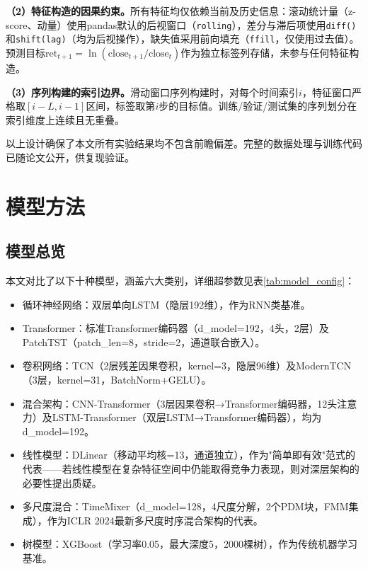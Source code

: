 \documentclass[12pt,a4paper]{ctexart}
\begin{document}
\textbf{（2）特征构造的因果约束。}所有特征均仅依赖当前及历史信息：滚动统计量（z-score、动量）使用pandas默认的后视窗口（\texttt{rolling}），差分与滞后项使用\texttt{diff()}和\texttt{shift(lag)}（均为后视操作），缺失值采用前向填充（\texttt{ffill}，仅使用过去值）。预测目标$\text{ret}_{t+1} = \ln(\text{close}_{t+1} / \text{close}_t)$作为独立标签列存储，未参与任何特征构造。

\textbf{（3）序列构建的索引边界。}滑动窗口序列构建时，对每个时间索引$i$，特征窗口严格取$[i-L, i-1]$区间，标签取第$i$步的目标值。训练/验证/测试集的序列划分在索引维度上连续且无重叠。

以上设计确保了本文所有实验结果均不包含前瞻偏差。完整的数据处理与训练代码已随论文公开，供复现验证。

\section{模型方法}

\subsection{模型总览}

本文对比了以下十种模型，涵盖六大类别，详细超参数见表\ref{tab:model_config}：

\begin{itemize}[leftmargin=2.5em]
    \item 循环神经网络：双层单向LSTM\cite{hochreiter1997}（隐层192维），作为RNN类基准。
    \item Transformer：标准Transformer编码器\cite{vaswani2017}（d\_model=192，4头，2层）及PatchTST\cite{nie2023}（patch\_len=8，stride=2，通道联合嵌入）。
    \item 卷积网络：TCN\cite{bai2018}（2层残差因果卷积，kernel=3，隐层96维）及ModernTCN\cite{luo2024}（3层，kernel=31，BatchNorm+GELU）。
    \item 混合架构：CNN-Transformer（3层因果卷积→Transformer编码器，12头注意力）及LSTM-Transformer（双层LSTM→Transformer编码器），均为d\_model=192。
    \item 线性模型：DLinear\cite{zeng2023}（移动平均核=13，通道独立），作为"简单即有效"范式的代表——若线性模型在复杂特征空间中仍能取得竞争力表现，则对深层架构的必要性提出质疑。
    \item 多尺度混合：TimeMixer\cite{wang2024timemixer}（d\_model=128，4尺度分解，2个PDM块，FMM集成），作为ICLR 2024最新多尺度时序混合架构的代表。
    \item 树模型：XGBoost\cite{chen2016}（学习率0.05，最大深度5，2000棵树），作为传统机器学习基准。
\end{itemize}
\end{document}
